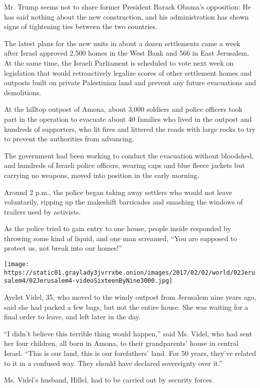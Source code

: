 Mr. Trump seems not to share former President Barack Obama's opposition:
He has said nothing about the new construction, and his administration
has shown signs of tightening ties between the two countries.

The latest plans for the new units in about a dozen settlements came a
week after Israel approved 2,500 homes in the West Bank and 566 in East
Jerusalem. At the same time, the Israeli Parliament is scheduled to vote
next week on legislation that would retroactively legalize scores of
other settlement homes and outposts built on private Palestinian land
and prevent any future evacuations and demolitions.

At the hilltop outpost of Amona, about 3,000 soldiers and police
officers took part in the operation to evacuate about 40 families who
lived in the outpost and hundreds of supporters, who lit fires and
littered the roads with large rocks to try to prevent the authorities
from advancing.

The government had been working to conduct the evacuation without
bloodshed, and hundreds of Israeli police officers, wearing caps and
blue fleece jackets but carrying no weapons, moved into position in the
early morning.

Around 2 p.m., the police began taking away settlers who would not leave
voluntarily, ripping up the makeshift barricades and smashing the
windows of trailers used by activists.

As the police tried to gain entry to one house, people inside responded
by throwing some kind of liquid, and one man screamed, ``You are
supposed to protect us, not break into our homes!''

\texttt{[image: https://static01.graylady3jvrrxbe.onion/images/2017/02/02/world/02Jerusalem4/02Jerusalem4-videoSixteenByNine3000.jpg]}

Ayelet Videl, 35, who moved to the windy outpost from Jerusalem nine
years ago, said she had packed a few bags, but not the entire house. She
was waiting for a final order to leave, and left later in the day.

``I didn't believe this terrible thing would happen,'' said Ms. Videl,
who had sent her four children, all born in Amona, to their
grandparents' house in central Israel. ``This is our land, this is our
forefathers' land. For 50 years, they've related to it in a confused
way. They should have declared sovereignty over it.''

Ms. Videl's husband, Hillel, had to be carried out by security forces.

